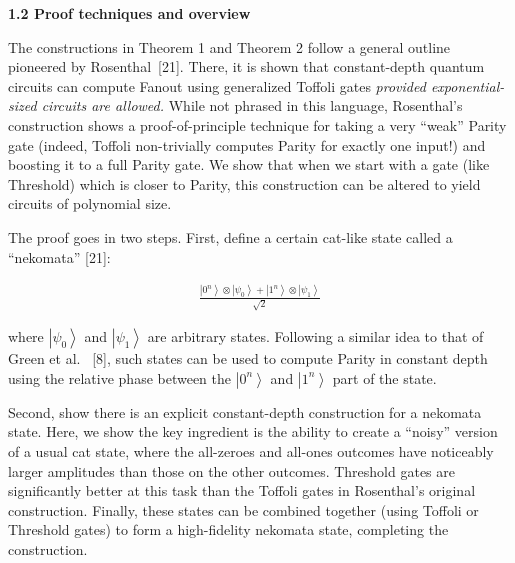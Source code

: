 \documentclass[10pt,a4paper]{article}
\begin{document}
\par\medskip\noindent\textbf{
1.2 Proof techniques and overview}\par




The constructions in Theorem 1 and Theorem 2 follow a general outline pioneered by Rosenthal [21]. There, it is shown that constant-depth quantum circuits can compute Fanout using generalized Toffoli gates \emph{provided exponential-sized circuits are allowed.} While not phrased in this language, Rosenthal’s construction shows a proof-of-principle technique for taking a very “weak” Parity gate (indeed, Toffoli non-trivially computes Parity for exactly one input!) and boosting it to a full Parity gate. We show that when we start with a gate (like Threshold) which is closer to Parity, this construction can be altered to yield circuits of polynomial size.\par




The proof goes in two steps. First, define a certain cat-like state called a “nekomata” [21]:\par


\[\begin{gathered}
\frac{\left|0^{n}\right\rangle\otimes\left|\psi_{0}\right\rangle+\left|1^{n}\right\rangle\otimes\left|\psi_{1}\right\rangle}{\sqrt{2}}
\end{gathered}\]


where $\left|\psi_{0}\right\rangle$ and $\left|\psi_{1}\right\rangle$ are arbitrary states. Following a similar idea to that of Green et al.  [8], such states can be used to compute Parity in constant depth using the relative phase between the $\left|0^{n}\right\rangle$ and $\left|1^{n}\right\rangle$ part of the state.\par




Second, show there is an explicit constant-depth construction for a nekomata state. Here, we show the key ingredient is the ability to create a “noisy” version of a usual cat state, where the all-zeroes and all-ones outcomes have noticeably larger amplitudes than those on the other outcomes. Threshold gates are significantly better at this task than the Toffoli gates in Rosenthal’s original construction. Finally, these states can be combined together (using Toffoli or Threshold gates) to form a high-fidelity nekomata state, completing the construction.\par
\end{document}
